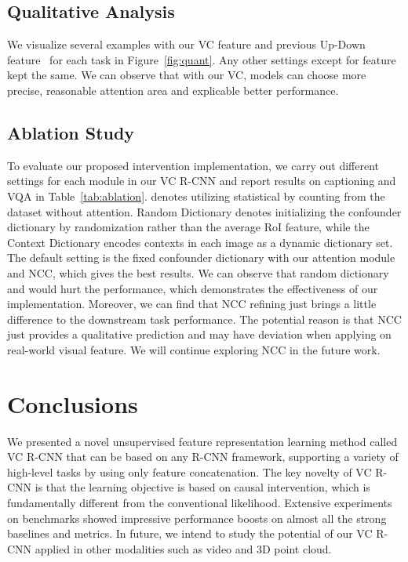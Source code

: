 \documentclass[10pt,twocolumn,letterpaper]{article}
\begin{document}
\subsection{Qualitative Analysis}
We visualize several examples with our VC feature and previous Up-Down feature~\cite{anderson2018bottom} for each task in Figure~\ref{fig:quant}. Any other settings except for feature kept the same. We can observe that with our VC, models can choose more precise, reasonable attention area and explicable better performance. 







\subsection{Ablation Study}
To evaluate our proposed intervention implementation, we carry out different settings for each module in our VC R-CNN and report results on captioning and VQA in Table~\ref{tab:ablation}.
 denotes utilizing statistical  by counting from the dataset without attention.
Random Dictionary denotes initializing the confounder dictionary by randomization rather than the average RoI feature, while the Context Dictionary encodes contexts in each image as a dynamic dictionary set.
The default setting is the fixed confounder dictionary with our attention module and NCC, which gives the best results.
We can observe that random dictionary and  would hurt the performance, which demonstrates the effectiveness of our implementation.
Moreover, we can find that NCC refining just brings a little difference to the downstream task performance. The potential reason is that NCC just provides a qualitative prediction and may have deviation when applying on real-world visual feature. We will continue exploring NCC in the future work.
\vspace{-0.1cm}



 \section{Conclusions}

\vspace{-0.1cm}

We presented a novel unsupervised feature representation learning method called VC R-CNN that can be based on any R-CNN framework, supporting a variety of high-level tasks by using only feature concatenation. The key novelty of VC R-CNN is that the learning objective is based on causal intervention, which is fundamentally different from the conventional likelihood. Extensive experiments on benchmarks showed impressive performance boosts on almost all the strong baselines and metrics. In future, we intend to study the potential of our VC R-CNN applied in other modalities such as video and 3D point cloud.
\end{document}
